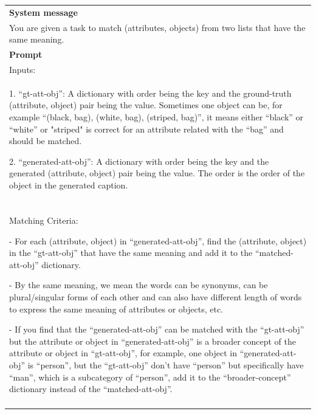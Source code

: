 \begin{table}[h!]\centering
\begin{minipage}{0.95\textwidth}   
\centering
\begin{tcolorbox} 
    \centering

      \small
    \begin{tabular}{p{}}
   { {\bf System message} } \\
You are given a task to match (attributes, objects) from two lists that have the same meaning. \\
    \midrule
    {\bf Prompt}  \\
        
        Inputs:\\
        
        1. ``gt-att-obj'': A dictionary with order being the key and the ground-truth (attribute, object) pair being the value. Sometimes one object can be, for example ``(black, bag), (white, bag), (striped, bag)'', it means either ``black'' or ``white'' or "striped" is correct for an attribute related with the ``bag'' and should be matched. 
        
        2. ``generated-att-obj'': A dictionary with order being the key and the generated (attribute, object) pair being the value. The order is the order of the object in the generated caption. \\\\

        Matching Criteria:
        
        - For each (attribute, object) in ``generated-att-obj'', find the (attribute, object) in the ``gt-att-obj'' that have the same meaning and add it to the ``matched-att-obj'' dictionary.
        
        - By the same meaning, we mean the words can be synonyms, can be plural/singular forms of each other and can also have different length of words to express the same meaning of attributes or objects, etc. 
        
        - If you find that the ``generated-att-obj'' can be matched with the ``gt-att-obj'' but the attribute or object in ``generated-att-obj'' is a broader concept of the attribute or object in ``gt-att-obj'', for example, one object in ``generated-att-obj'' is ``person'', but the ``gt-att-obj'' don't have ``person'' but specifically have ``man'', which is a subcategory of ``person'', add it to the ``broader-concept'' dictionary instead of the ``matched-att-obj''.\\\\
        

\end{tabular}
\end{tcolorbox}
\end{minipage}
\end{table}
